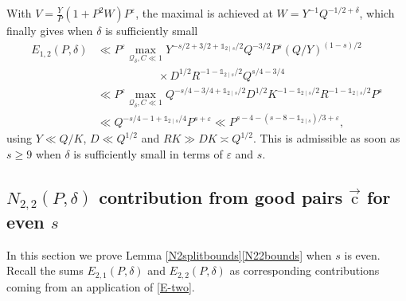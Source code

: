 \documentclass[letterpaper,11pt]{amsart}
\numberwithin{equation}{section}
\theoremstyle{definition}
\numberwithin{equation}{section}
\newcommand{\uc}{{\vec{\mathrm{c}}}}
\newcommand{\ve}{\varepsilon}
\begin{document}
With $V=\frac{Y}{P}(1+P^2 W)P^\ve$, the maximal is achieved at $W=Y^{-1}Q^{-1/2+\delta}$, which finally gives when $\delta$ is sufficiently small
\begin{align*}
E_{1,2}(P, \delta)&\ll P^{\ve} \max_{\mathcal Q_\delta, C\ll 1}Y^{-s/2+3/2+\mathds 1_{2\mid s}/2}Q^{-3/2}P^{s}(Q/Y)^{(1-s)/2} \\ & \quad \quad \quad \quad \quad \ \ \times D^{1/2}R^{-1-\mathds 1_{2\mid s}/2}Q^{s/4-3/4}\\
&\ll P^{\ve}\max_{\mathcal Q_\delta, C\ll 1} Q^{-s/4-3/4+\mathds 1_{2\mid s}/2}D^{1/2}K^{-1-\mathds 1_{2\mid s}/2}R^{-1-\mathds 1_{2\mid s}/2}P^{s}\\
&\ll Q^{-s/4-1+\mathds 1_{2\mid s}/4}P^{s+\ve}\ll P^{s-4-(s-8-\mathds 1_{2\mid s})/3+\ve},
\end{align*}
using $Y\ll Q/K$, $D\ll Q^{1/2}$ and $RK\gg DK\asymp Q^{1/2}$.
This is admissible as soon as $s\geq 9$ when $\delta$ is sufficiently small in terms of $\ve$ and $s$. 

\subsection{$N_{2,2}(P, \delta)$ contribution from good pairs \texorpdfstring{$\uc$}{c} for even \texorpdfstring{$s$}{s}}\label{sec:good-pairs-unconditional}

In this section we prove Lemma \ref{N2splitbounds}\eqref{N22bounds} when $s$ is even. Recall the sums \(E_{2,1}(P, \delta)\) and \(E_{2,2}(P, \delta)\) as corresponding contributions coming from an application of \eqref{E-two}.
 
\end{document}
